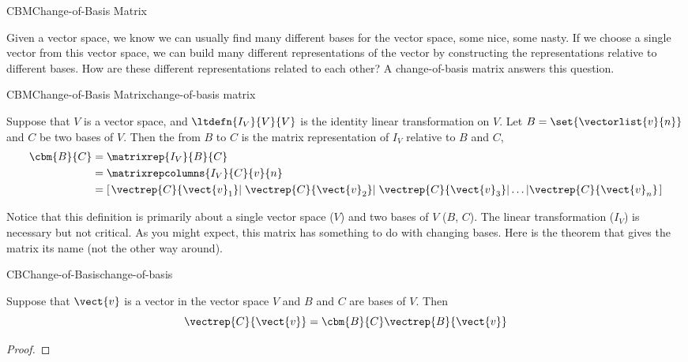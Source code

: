 \begin{subsect}{CBM}{Change-of-Basis Matrix}
%
\begin{para}Given a vector space, we know we can usually find many different bases for the vector space, some nice, some nasty.  If we choose a single vector from this vector space, we can build many different representations of the vector by constructing the representations relative to different bases.  How are these different representations related to each other?  A change-of-basis matrix answers this question.\end{para}
%
\begin{definition}{CBM}{Change-of-Basis Matrix}{change-of-basis matrix}
\begin{para}Suppose that $V$ is a vector space, and $\ltdefn{I_V}{V}{V}$ is the identity linear transformation on $V$.  Let $B=\set{\vectorlist{v}{n}}$ and $C$ be two bases of $V$.  Then the  from $B$ to $C$ is the matrix representation of $I_V$ relative to $B$ and $C$,
%
\begin{align*}
\cbm{B}{C}&=\matrixrep{I_V}{B}{C}\\
&=\matrixrepcolumns{I_V}{C}{v}{n}\\
&=\left\lbrack
\left.\vectrep{C}{\vect{v}_1}\right|
\left.\vectrep{C}{\vect{v}_2}\right|
\left.\vectrep{C}{\vect{v}_3}\right|
\ldots
\left|\vectrep{C}{\vect{v}_n}\right.
\right\rbrack
\end{align*}
\end{para}
%
\end{definition}
%
\begin{para}Notice that this definition is primarily about a single vector space ($V$) and two bases of $V$ ($B$, $C$).  The linear transformation ($I_V$) is necessary but not critical.  As you might expect, this matrix has something to do with changing bases.  Here is the theorem that gives the matrix its name (not the other way around).\end{para}
%
\begin{theorem}{CB}{Change-of-Basis}{change-of-basis}
\begin{para}Suppose that $\vect{v}$ is a vector in the vector space $V$ and $B$ and $C$ are bases of $V$.  Then
%
\begin{equation*}
\vectrep{C}{\vect{v}}=\cbm{B}{C}\vectrep{B}{\vect{v}}
\end{equation*}
\end{para}
%
\end{theorem}
%
\begin{proof}

\end{proof}
\end{subsect}
